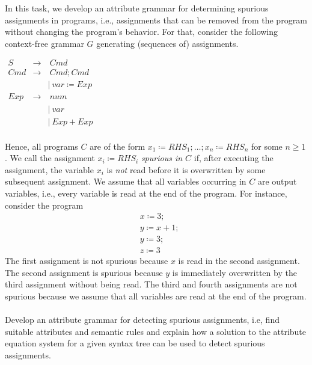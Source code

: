 \begin{exercise}{40}
In this task, we develop an attribute grammar for determining spurious assignments in programs, i.e., assignments that can be removed from the program without changing the program's behavior. For that, consider the following context-free grammar $G$ generating (sequences of) assignments.

\vspace{0.3cm}

  \begin{center}
	$\begin{array}{lcll}
	  S &\to& ~Cmd &  \\
	  Cmd &\to& ~Cmd;Cmd & \\
      &&\mid ~ var \coloneqq Exp \\
	  Exp &\to& ~num \\
	  &&\mid ~ var \\
	  &&\mid ~ Exp + Exp\\
	\end{array}$
   \end{center}

Hence, all programs $C$ are of the form $x_1 \coloneqq RHS_1; \ldots; x_n \coloneqq RHS_n$ for some $n\geq 1$. We call the assignment $x_i \coloneqq RHS_i$ \emph{spurious in $C$} if, after executing the assignment, the variable $x_i$ is \emph{not} read before it is overwritten by some subsequent assignment. We assume that all variables occurring in $C$ are output variables, i.e., every variable is read at the end of the program. For instance, consider the program
%
\begin{align*}
   &x \coloneqq 3; \\
   &y \coloneqq x+1; \\
   &y\coloneqq 3; \\
   &z \coloneqq  3
\end{align*}
%
The first assignment is not spurious because $x$ is read in the second assignment. The second assignment is spurious because $y$ is immediately overwritten by the third assignment without being read. The third and fourth assignments are not spurious because we assume that all variables are read at the end of the program. \\ \\
%
\noindent 
Develop an attribute grammar for detecting spurious assignments, i.e, find suitable attributes and semantic rules and explain how a solution to the attribute equation system for a given syntax tree can be used to detect spurious assignments.
\end{exercise}

